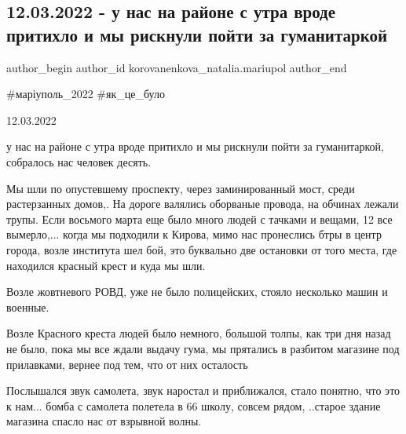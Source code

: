  
 
 
 
 

\subsection{12.03.2022 - у нас на районе с утра вроде притихло и мы рискнули пойти за гуманитаркой}
\label{sec:12_03_2023.fb.korovanenkova_natalia.mariupol.1.12_03_2022___u_nas_n}

\ifcmt
 author_begin
   author_id korovanenkova_natalia.mariupol
 author_end
\fi

\#маріуполь\_2022 \#як\_це\_було

12.03.2022 

у нас на районе с утра вроде притихло и мы рискнули пойти за гуманитаркой,
собралось нас человек десять.

Мы шли по опустевшему проспекту, через заминированный мост, среди растерзанных
домов,. На дороге валялись оборваные провода, на обчинах лежали трупы. Если
восьмого марта еще было много людей с тачками и вещами, 12  все вымерло,... когда
мы подходили к  Кирова, мимо нас пронеслись бтры в центр города, возле
института шел бой, это буквально две остановки от того места, где находился
красный крест и куда мы шли.

Возле жовтневого РОВД, уже не было полицейских, стояло несколько машин и
военные.

Возле Красного креста людей было немного,  большой толпы, как три дня назад не
было, пока мы все ждали выдачу гума, мы прятались в разбитом магазине под
прилавками, вернее под тем, что от них осталость 

Послышался звук самолета, звук наростал и приближался,  стало понятно, что это
к нам... бомба с самолета полетела в  66 школу, совсем рядом, ..старое здание
магазина  спасло нас  от взрывной волны.

